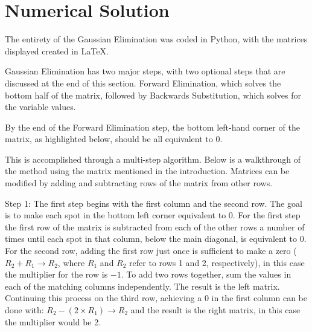 \documentclass[12pt, letterpaper]{article}
\begin{document}
	 
\section{\label{solution}Numerical Solution}
	The entirety of the Gaussian Elimination was coded in Python, with the matrices displayed created in \LaTeX{}.
	
	Gaussian Elimination has two major steps, with two optional steps that are discussed at the end of this section. Forward Elimination, which solves the bottom half of the matrix, followed by Backwards Substitution, which solves for the variable values.
	 
	 By the end of the Forward Elimination step, the bottom left-hand corner of the matrix, as highlighted below, should be all equivalent to 0. \vspace{\baselineskip}
	
	This is accomplished through a multi-step algorithm. Below is a walkthrough of the method using the matrix mentioned in the introduction. Matrices can be modified by adding and subtracting rows of the matrix from other rows.\vspace{\baselineskip}
	
	Step 1: The first step begins with the first column and the second row. The goal is to make each spot in the bottom left corner equivalent to 0. For the first step the first row of the matrix is subtracted from each of the other rows a number of times until each spot in that column, below the main diagonal, is equivalent to 0. For the second row, adding the first row just once is sufficient to make a zero ($R_2 + R_1 \rightarrow R_2$, where $R_1$ and $R_2$ refer to rows 1 and 2, respectively), in this case the multiplier for the row is $-1$. To add two rows together, sum the values in each of the matching columns independently. The result is the left matrix. Continuing this process on the third row, achieving a 0 in the first column can be done with: $R_2 - (2\times R_1) \rightarrow R_2$ and the result is the right matrix, in this case the multiplier would be 2.
	
\end{document}
